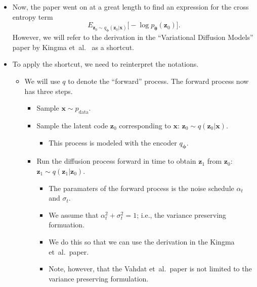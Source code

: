 \documentclass[10pt]{article}
\newcommand{\ve}[1]{\mathbf{#1}}
\newcommand{\ves}[1]{\boldsymbol{#1}}
\newcommand{\etal}{{et~al.}}
\newcommand{\data}{\mathrm{data}}
\begin{document}
\begin{itemize}
  \item Now, the paper went on at a great length to find an expression for the cross entropy term $$E_{\ve{z}_0 \sim q_{\ves{\phi}}(\ve{z}_0|\ve{x})}\Big[ - \log p_{\ves{\theta}}(\ve{z}_0) \Big].$$ However, we will refer to the derivation in the ``Variational Diffusion Models'' paper by Kingma \etal~\cite{Kingma:2021, KhungurnVDM} as a shortcut.
  
  \item To apply the shortcut, we need to reinterpret the notations.
  \begin{itemize}
    \item We will use $q$ to denote the ``forward'' process. The forward process now has three steps.
    \begin{itemize}
      \item Sample $\ve{x} \sim p_{\data}$.
      \item Sample the latent code $\ve{z}_0$ corresponding to $\ve{x}$: $\ve{z}_0 \sim q(\ve{z}_0|\ve{x})$.
      \begin{itemize}
        \item This process is modeled with the encoder $q_{\ves{\phi}}$.
      \end{itemize}
      \item Run the diffusion process forward in time to obtain $\ve{z}_1$ from $\ve{z}_0$: $\ve{z}_1 \sim q(\ve{z}_1|\ve{z}_0)$.
      \begin{itemize}
        \item The paramaters of the forward process is the noise schedule $\alpha_t$ and $\sigma_t$. 
        \item We assume that $\alpha_t^2 + \sigma_t^2 = 1$; i.e., the variance preserving formuation. 
        \item We do this so that we can use the derivation in the Kingma \etal\ paper.
        \item Note, however, that the Vahdat \etal\ paper is not limited to the variance preserving formulation.
      \end{itemize}
    \end{itemize}


\end{itemize}
\end{itemize}
\end{document}
